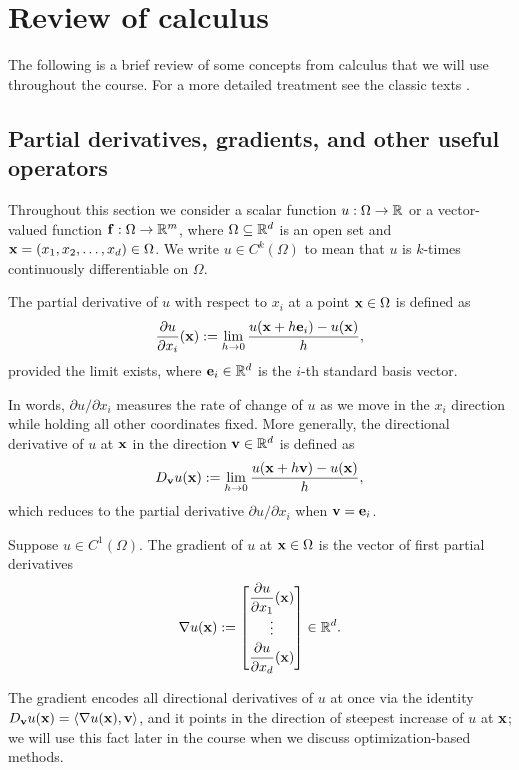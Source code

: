 \chapter{Review of calculus}
\label{ch:Lec-1-calculus}

The following is a brief review of some concepts from 
calculus that we will use throughout the course. 
For a more detailed treatment see the classic texts 
\cite{apostol1991calculus-1,apostol1991calculus-2, babyrudin}.


\section{Partial derivatives, gradients, and other useful operators}

Throughout this section we consider a scalar function $u: \Omega \to \mathbb{R}$
or a vector-valued function $\mathbf{f}: \Omega \to \mathbb{R}^m$, where $\Omega
\subseteq \mathbb{R}^d$ is an open set and $\mathbf{x} = (x_1, x_2, \ldots, x_d) \in
\Omega$. We write $u \in C^k(\Omega)$ to mean that $u$ is $k$-times
continuously differentiable on $\Omega$.

\begin{definition}
    The partial derivative of $u$ with respect to $x_i$ at a point
    $\mathbf{x} \in \Omega$ is defined as
    \begin{equation*}
        \frac{\partial u}{\partial x_i}(\mathbf{x}) :=
        \lim_{h \to 0} \frac{u(\mathbf{x} + h \mathbf{e}_i) - u(\mathbf{x})}{h},
    \end{equation*}
    provided the limit exists, where $\mathbf{e}_i \in \mathbb{R}^d$ is the $i$-th
    standard basis vector.
\end{definition}
In words, $\partial u/\partial x_i$ measures the rate of change of $u$
as we move in the $x_i$ direction while holding all other coordinates
fixed. More generally, the directional derivative of $u$ at $\mathbf{x}$ in the
direction $\mathbf{v} \in \mathbb{R}^d$ is defined as
\begin{equation*}
    D_{\mathbf{v}} u(\mathbf{x}) := \lim_{h \to 0} \frac{u(\mathbf{x} + h\mathbf{v}) - u(\mathbf{x})}{h},
\end{equation*}
which reduces to the partial derivative $\partial u/\partial x_i$ when
$\mathbf{v} = \mathbf{e}_i$.

\begin{definition}[Gradient]
    Suppose $u \in C^1(\Omega)$. The gradient of $u$ at $\mathbf{x} \in \Omega$
    is the vector of first partial derivatives
    \begin{equation*}
        \nabla u(\mathbf{x}) :=
        \begin{bmatrix}
            \dfrac{\partial u}{\partial x_1}(\mathbf{x}) \\[1ex]
            \vdots \\[0.5ex]
            \dfrac{\partial u}{\partial x_d}(\mathbf{x})
        \end{bmatrix} \in \mathbb{R}^d.
    \end{equation*}
\end{definition}
The gradient encodes all directional derivatives of $u$ at once via the
identity $D_{\mathbf{v}} u(\mathbf{x}) = \langle \nabla u(\mathbf{x}), \mathbf{v} \rangle$, and it
points in the direction of steepest increase of $u$ at $\mathbf{x}$; we will
use this fact later in the course when we discuss optimization-based
methods.

